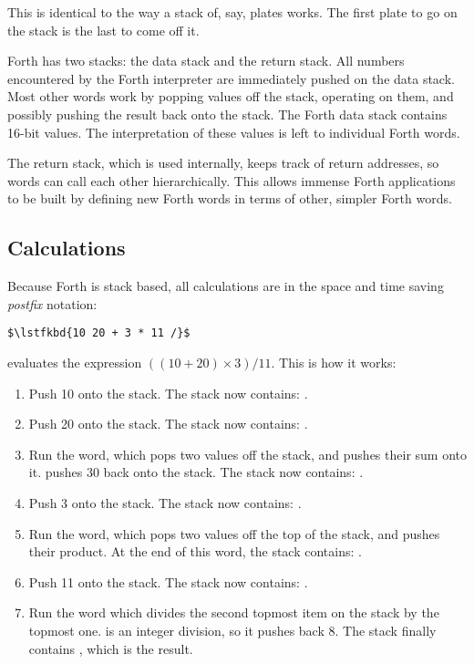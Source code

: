 This is identical to the way a stack of, say, plates works. The first plate to
go on the stack is the last to come off it.

Forth has two stacks: the data stack and the return stack. All numbers
encountered by the Forth interpreter are immediately pushed on the data
stack. Most other words work by popping values off the stack, operating on
them, and possibly pushing the result back onto the stack. The Forth data stack
contains 16-bit values. The interpretation of these values is left to
individual Forth words.

The return stack, which is used internally, keeps track of return addresses, so
words can call each other hierarchically. This allows immense Forth
applications to be built by defining new Forth words in terms of other, simpler
Forth words.

\subsection{Calculations}

Because Forth is stack based, all calculations are in the space and time saving
{\em\gls{postfix}} notation:

\begin{lstlisting}[mathescape=true,numbers=none]
$\lstfkbd{10 20 + 3 * 11 /}$
\end{lstlisting}

\noindent evaluates the expression $((10 + 20) \times 3) / 11$. This is how it
works:

\begin{enumerate}
\item Push 10 onto the stack. The stack now contains: .
\item Push 20 onto the stack. The stack now contains: .
\item Run the \fw{+} word, which pops two values off the stack, and pushes
  their sum onto it. \fw{+} pushes 30 back onto the stack. The stack now
  contains: .
\item Push 3 onto the stack. The stack now contains: .
\item Run the \fw{*} word, which pops two values off the top of the stack, and
  pushes their product. At the end of this word, the stack contains:
  .
\item Push 11 onto the stack. The stack now contains: .
\item Run the \fw{/} word which divides the second topmost item on the stack by
  the topmost one. \fw{/} is an integer division, so it pushes back 8. The
  stack finally contains , which is the result.
\end{enumerate}

